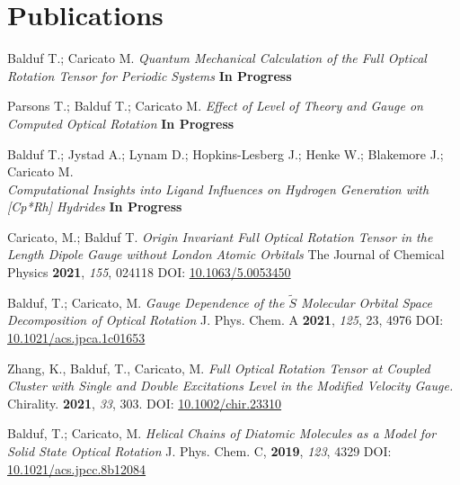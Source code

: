 \documentclass[a4paper,11pt]{article}
\begin{document}
\section{Publications}
  \begin{etaremune}
  
  \item Balduf T.; Caricato M. \textit{Quantum Mechanical Calculation of the Full Optical Rotation Tensor for Periodic Systems} \textbf{In Progress}
  
  \item Parsons T.; Balduf T.; Caricato M. \textit{Effect of Level of Theory and Gauge on Computed Optical Rotation} \textbf{In Progress}
  
  \item Balduf T.; Jystad A.; Lynam D.; Hopkins-Lesberg J.;  Henke W.; Blakemore J.; Caricato M. \\ \textit{Computational Insights into Ligand Influences on Hydrogen Generation with [Cp*Rh] Hydrides} \textbf{In Progress}
  
  \item Caricato, M.; Balduf T. \textit{Origin Invariant Full Optical Rotation Tensor in the Length Dipole Gauge without London Atomic Orbitals} The Journal of Chemical Physics \textbf{2021}, \textit{155}, 024118 DOI: \href{https://doi.org/10.1063/5.0053450}{10.1063/5.0053450} 
  
  \item Balduf, T.; Caricato, M. \textit{Gauge Dependence of the $\tilde{S}$ Molecular Orbital Space Decomposition of Optical Rotation} J. Phys. Chem. A \textbf{2021}, \textit{125}, 23, 4976 DOI: \href{https://doi.org/10.1021/acs.jpca.1c01653}{10.1021/acs.jpca.1c01653} 
  
  \item Zhang, K., Balduf, T., Caricato, M. \textit{Full Optical Rotation Tensor at Coupled Cluster with Single and Double Excitations Level in the Modified Velocity Gauge.} Chirality. \textbf{2021}, \textit{33}, 303. DOI:   \href{https://doi.org/10.1002/chir.23310}{10.1002/chir.23310}
  
  \item Balduf, T.; Caricato, M. \textit{Helical Chains of Diatomic Molecules as a Model for Solid State Optical Rotation} J. Phys. Chem. C, \textbf{2019}, \textit{123}, 4329 DOI: \href{https://doi.org/10.1021/acs.jpcc.8b12084}{10.1021/acs.jpcc.8b12084} 
  \end{etaremune}
\vspace{-5pt}
	    
\end{document}
